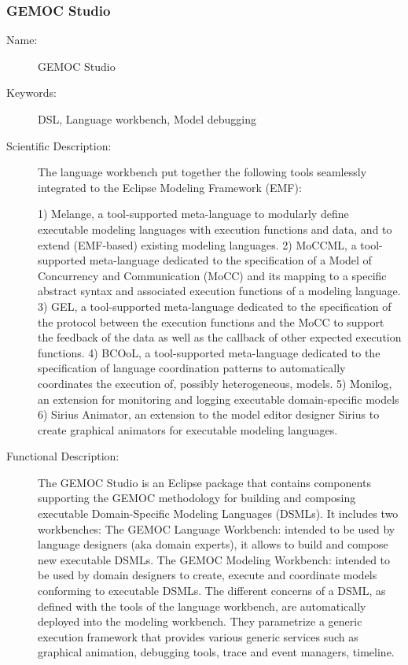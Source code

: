 \subsubsection{GEMOC Studio}
\label{bil-2742}
\begin{description}
\item[Name:] GEMOC Studio
\item[Keywords:] DSL, Language workbench, Model debugging
\item[Scientific Description:]
The language workbench put together the following tools seamlessly integrated to the Eclipse Modeling Framework (EMF):

 1)  Melange, a tool-supported meta-language to modularly define executable modeling languages with execution functions and data, and to extend (EMF-based) existing modeling languages.
 2)  MoCCML, a tool-supported meta-language dedicated to the specification of a Model of Concurrency and Communication (MoCC) and its mapping to a specific abstract syntax and associated execution functions of a modeling language.
 3)  GEL, a tool-supported meta-language dedicated to the specification of the protocol between the execution functions and the MoCC to support the feedback of the data as well as the callback of other expected execution functions.
 4) BCOoL, a tool-supported meta-language dedicated to the specification of language coordination patterns to automatically coordinates the execution of, possibly heterogeneous, models.
 5) Monilog, an extension for monitoring and logging executable domain-specific models
 6) Sirius Animator, an extension to the model editor designer Sirius to create graphical animators for executable modeling languages.
\item[Functional Description:]
The GEMOC Studio is an Eclipse package that contains components supporting the GEMOC methodology for building and composing executable Domain-Specific Modeling Languages (DSMLs). It includes two workbenches:
    The GEMOC Language Workbench: intended to be used by language designers (aka domain experts), it allows to build and compose new executable DSMLs.
    The GEMOC Modeling Workbench: intended to be used by domain designers to create, execute and coordinate models conforming to executable DSMLs. The different concerns of a DSML, as defined with the tools of the language workbench, are automatically deployed into the modeling workbench. They parametrize a generic execution framework that provides various generic services such as graphical animation, debugging tools, trace and event managers, timeline.


\end{description}

